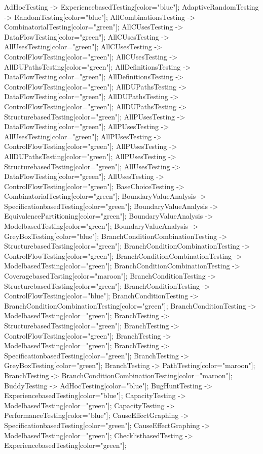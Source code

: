 \documentclass{article}
\begin{document}
{AdHocTesting -> ExperiencebasedTesting[color="blue"];
AdaptiveRandomTesting -> RandomTesting[color="blue"];
AllCombinationsTesting -> CombinatorialTesting[color="green"];
AllCUsesTesting -> DataFlowTesting[color="green"];
AllCUsesTesting -> AllUsesTesting[color="green"];
AllCUsesTesting -> ControlFlowTesting[color="green"];
AllCUsesTesting -> AllDUPathsTesting[color="green"];
AllDefinitionsTesting -> DataFlowTesting[color="green"];
AllDefinitionsTesting -> ControlFlowTesting[color="green"];
AllDUPathsTesting -> DataFlowTesting[color="green"];
AllDUPathsTesting -> ControlFlowTesting[color="green"];
AllDUPathsTesting -> StructurebasedTesting[color="green"];
AllPUsesTesting -> DataFlowTesting[color="green"];
AllPUsesTesting -> AllUsesTesting[color="green"];
AllPUsesTesting -> ControlFlowTesting[color="green"];
AllPUsesTesting -> AllDUPathsTesting[color="green"];
AllPUsesTesting -> StructurebasedTesting[color="green"];
AllUsesTesting -> DataFlowTesting[color="green"];
AllUsesTesting -> ControlFlowTesting[color="green"];
BaseChoiceTesting -> CombinatorialTesting[color="green"];
BoundaryValueAnalysis -> SpecificationbasedTesting[color="green"];
BoundaryValueAnalysis -> EquivalencePartitioning[color="green"];
BoundaryValueAnalysis -> ModelbasedTesting[color="green"];
BoundaryValueAnalysis -> GreyBoxTesting[color="blue"];
BranchConditionCombinationTesting -> StructurebasedTesting[color="green"];
BranchConditionCombinationTesting -> ControlFlowTesting[color="green"];
BranchConditionCombinationTesting -> ModelbasedTesting[color="green"];
BranchConditionCombinationTesting -> CoveragebasedTesting[color="maroon"];
BranchConditionTesting -> StructurebasedTesting[color="green"];
BranchConditionTesting -> ControlFlowTesting[color="blue"];
BranchConditionTesting -> BranchConditionCombinationTesting[color="green"];
BranchConditionTesting -> ModelbasedTesting[color="green"];
BranchTesting -> StructurebasedTesting[color="green"];
BranchTesting -> ControlFlowTesting[color="green"];
BranchTesting -> ModelbasedTesting[color="green"];
BranchTesting -> SpecificationbasedTesting[color="green"];
BranchTesting -> GreyBoxTesting[color="green"];
BranchTesting -> PathTesting[color="maroon"];
BranchTesting -> BranchConditionCombinationTesting[color="maroon"];
BuddyTesting -> AdHocTesting[color="blue"];
BugHuntTesting -> ExperiencebasedTesting[color="blue"];
CapacityTesting -> ModelbasedTesting[color="green"];
CapacityTesting -> PerformanceTesting[color="blue"];
CauseEffectGraphing -> SpecificationbasedTesting[color="green"];
CauseEffectGraphing -> ModelbasedTesting[color="green"];
ChecklistbasedTesting -> ExperiencebasedTesting[color="green"];
}
\end{document}
